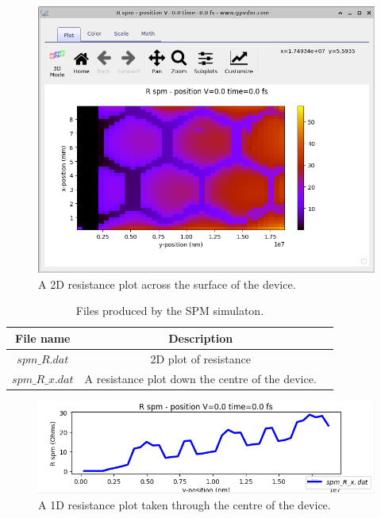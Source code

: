 \begin{figure}[H]
\centering
\includegraphics[width=\textwidth]{./images/la_4.png}
\caption{A 2D resistance plot across the surface of the device.}
\label{fig:resistancemap}
\end{figure}

\begin{table}[H]
\begin{center}
\begin{tabular}{ |c|c|c| } 
 \hline
	File name 			& 	Description  \\ 
 \hline
	$spm\_R.dat$ 		&	2D plot of resistance  \\
	$spm\_R\_x.dat$ 		&	A resistance plot down the centre of the device.  \\ 
 \hline
\end{tabular}
\caption{Files produced by the SPM simulaton.}
\label{tab:circuitoutputfiles}
\end{center}
\end{table}

\begin{figure}[H]
\centering
\includegraphics[width=\textwidth]{./images/la_5.png}
\caption{A 1D resistance plot taken through the centre of the device.}
\label{fig:circuittwodplot}
\end{figure}

